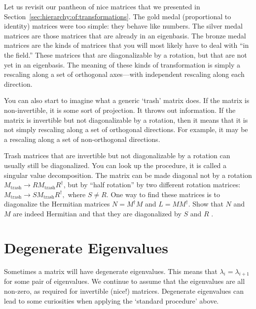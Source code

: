 \documentclass[12pt, oneside]{report}    %
\let\oldsection\section
\def\section{%
  \setcounter{sidenote}{1}%
  \oldsection
}
\begin{document}
\begin{bigidea}
Let us revisit our pantheon of nice matrices that we presented in Section~\ref{sec:hierarchy:of:transformations}. The gold medal (proportional to identity) matrices were too simple: they behave like numbers. The silver medal matrices are those matrices that are already in an eigenbasis. The bronze medal matrices are the kinds of matrices that you will most likely have to deal with ``in the field.'' These matrices that are diagonalizable by a rotation, but that are not yet in an eigenbasis. The meaning of these kinds of transformation is simply a rescaling along a set of orthogonal axes---with independent rescaling along each direction. 

You can also start to imagine what a generic `trash' matrix does. If the matrix is non-invertible, it is some sort of projection. It throws out information. If the matrix is invertible but not diagonalizable by a rotation, then it means that it is not simply rescaling along a set of orthogonal directions. For example, it may be a rescaling along a set of non-orthogonal directions. 
\end{bigidea}

\begin{exercise}
Trash matrices that are invertible but not diagonalizable by a rotation can usually still be diagonalized. You can look up the procedure, it is called a singular value decomposition. The matrix can be made diagonal not by a rotation $M_\text{trash}\to RM_\text{trash}R^\dag$, but by ``half rotation'' by two different rotation matrices: $M_\text{trash} \to SM_\text{trash} R^\dag,$ where $S \neq R$. One way to find these matrices is to diagonalize the Hermitian matrices $N=M^\dag M$ and $L = M M^\dag$. Show that $N$ and $M$ are indeed Hermitian and that they are diagonalized by $S$ and $R$ .
\end{exercise}






\section{Degenerate Eigenvalues}

Sometimes a matrix will have degenerate eigenvalues. This means that $\lambda_i = \lambda_{i+1}$ for some pair of eigenvalues. We continue to assume that the eigenvalues are all non-zero, as required for invertible (nice!) matrices.  Degenerate eigenvalues can lead to some curiosities when applying the `standard procedure' above. 
\end{document}
